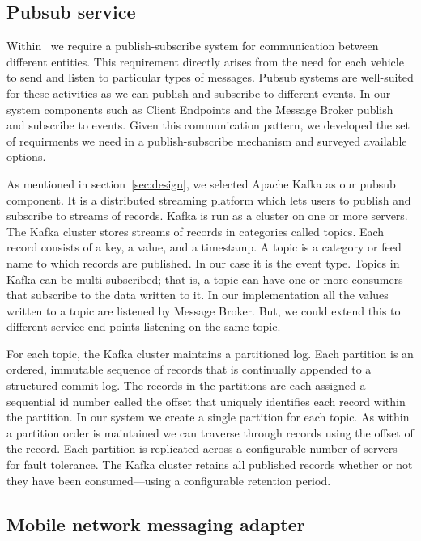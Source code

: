 \subsection{Pubsub service}

Within \name~we require a publish-subscribe system for communication
between different entities.  This requirement directly arises from the
need for each vehicle to send and listen to particular types of
messages. Pubsub systems are well-suited for these activities as we
can publish and subscribe to different events. In our system
components such as Client Endpoints and the Message Broker publish and
subscribe to events.  Given this communication pattern, we developed
the set of requirments we need in a publish-subscribe mechanism and
surveyed available options.

As mentioned in section~\ref{sec:design}, we selected Apache Kafka as our pubsub
component. It is a distributed streaming platform which lets users to publish 
and subscribe to streams of records. Kafka is run as a cluster on one or more 
servers. The Kafka cluster stores streams of records in categories called topics.
Each record consists of a key, a value, and a timestamp. A topic is a category 
or feed name to which records are published. In our case it is the event type.
Topics in Kafka can be multi-subscribed; that is, a topic can have one or more 
consumers that subscribe to the data written to it. In our implementation
all the values written to a topic are listened by Message Broker. But, we could
extend this to different service end points listening on the same topic.

For each topic, the Kafka cluster maintains a partitioned log. Each partition 
is an ordered, immutable sequence of records that is continually appended to a 
structured commit log. The records in the partitions are each assigned a 
sequential id number called the offset that uniquely identifies each record 
within the partition. In our system we create a single partition for each topic.
As within a partition order is maintained we can traverse through records using
the offset of the record. Each partition is replicated across a configurable
number of servers for fault tolerance. The Kafka cluster retains all published 
records whether or not they have been consumed—using a configurable retention 
period.

\subsection{Mobile network messaging adapter}

